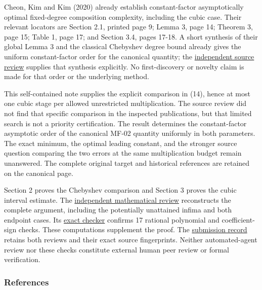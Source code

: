 \documentclass[10pt,a4paper]{article}
\begin{document}
Cheon, Kim and Kim (2020) already establish constant-factor
asymptotically optimal fixed-degree composition complexity, including
the cubic case. Their relevant locators are Section 2.1, printed page 9;
Lemma 3, page 14; Theorem 3, page 15; Table 1, page 17; and Section 3.4,
pages 17-18. A short synthesis of their global Lemma 3 and the classical
Chebyshev degree bound already gives the uniform constant-factor order
for the canonical quantity; the
\href{https://github.com/ajt60gaibb/OpenProblemsInNLA/blob/main/references/stepaniants-mf02-2026-09-12/verification/source-review/REVIEW.md}{independent
source review} supplies that synthesis explicitly. No first-discovery or
novelty claim is made for that order or the underlying method.

This self-contained note supplies the explicit comparison in (14), hence
at most one cubic stage per allowed unrestricted multiplication. The
source review did not find that specific comparison in the inspected
publications, but that limited search is not a priority certification.
The result determines the constant-factor asymptotic order of the
canonical MF-02 quantity uniformly in both parameters. The exact
minimum, the optimal leading constant, and the stronger source question
comparing the two errors at the same multiplication budget remain
unanswered. The complete original target and historical references are
retained on the canonical page.

Section 2 proves the Chebyshev comparison and Section 3 proves the cubic
interval estimate. The
\href{https://github.com/ajt60gaibb/OpenProblemsInNLA/blob/main/references/stepaniants-mf02-2026-09-12/verification/independent-review/MF-02-independent-review.md}{independent
mathematical review} reconstructs the complete argument, including the
potentially unattained infima and both endpoint cases. Its
\href{https://github.com/ajt60gaibb/OpenProblemsInNLA/blob/main/references/stepaniants-mf02-2026-09-12/verification/independent-review/exact_algebra_check.py}{exact
checker} confirms 17 rational polynomial and coefficient-sign checks.
These computations supplement the proof. The
\href{https://github.com/ajt60gaibb/OpenProblemsInNLA/blob/main/references/stepaniants-mf02-2026-09-12/README.md}{submission
record} retains both reviews and their exact source fingerprints.
Neither automated-agent review nor these checks constitute external
human peer review or formal verification.

\subsubsection{References}\label{references}
\end{document}
